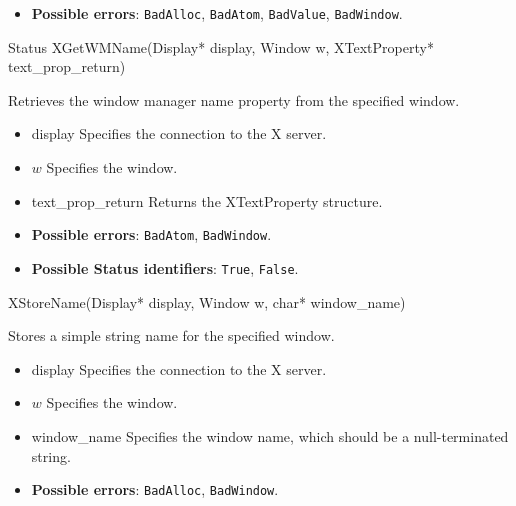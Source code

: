 \documentclass{report}
\begin{document}
\begin{itemize}
            \begin{itemize}
                \item \textbf{Possible errors}: \texttt{BadAlloc}, \texttt{BadAtom}, \texttt{BadValue}, \texttt{BadWindow}.
            \end{itemize}

            \begin{cppcode}
            Status XGetWMName(Display* display, Window w, XTextProperty* text_prop_return)
            \end{cppcode}
            \bigbreak \noindent
            Retrieves the window manager name property from the specified window.

            \begin{itemize}
                \item display Specifies the connection to the X server.
                \item $w$ Specifies the window.
                \item text\_prop\_return Returns the XTextProperty structure.
            \end{itemize}

            \begin{itemize}
                \item \textbf{Possible errors}: \texttt{BadAtom}, \texttt{BadWindow}.
                \item \textbf{Possible Status identifiers}: \texttt{True}, \texttt{False}.
            \end{itemize}

            \begin{cppcode}
            XStoreName(Display* display, Window w, char* window_name)
            \end{cppcode}
            \bigbreak \noindent
            Stores a simple string name for the specified window.

            \begin{itemize}
                \item display Specifies the connection to the X server.
                \item $w$ Specifies the window.
                \item window\_name Specifies the window name, which should be a null-terminated string.
            \end{itemize}

            \begin{itemize}
                \item \textbf{Possible errors}: \texttt{BadAlloc}, \texttt{BadWindow}.
            \end{itemize}


\end{itemize}
\end{document}
